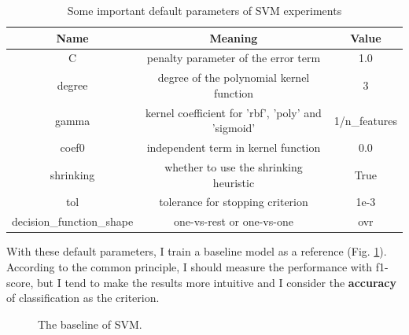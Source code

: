 \documentclass[12pt,a4paper]{article}
\theoremstyle{definition}
\begin{document}
\begin{table}[H]
	\renewcommand\arraystretch{1.35}
	\caption{Some important default parameters of SVM experiments}
	\label{tab:default-para}
	\centering
	
	\begin{tabular}{c|c|c}
		\centering
		Name & Meaning & Value \\
		\hline
		\hline
		
		C & penalty parameter of the error term & 1.0 \\
		degree & degree of the polynomial kernel function & 3 \\
		gamma & kernel coefficient for 'rbf', 'poly' and 'sigmoid' & 1/n\_features \\
		coef0 & independent term in kernel function & 0.0 \\
		shrinking & whether to use the shrinking heuristic & True \\
		tol & tolerance for stopping criterion & 1e-3 \\
		decision\_function\_shape & one-vs-rest or one-vs-one & ovr \\
		
	\end{tabular}
\end{table}

With these default parameters, I train a baseline model as a reference (Fig. \ref{fig:svm-baseline}). According to the common principle, I should measure the performance with f1-score, but I tend to make the results more intuitive and I consider the \textbf{accuracy} of classification as the criterion.

\begin{figure}[H]
	\centering
	\caption{The baseline of SVM.}
	\label{fig:svm-baseline}
\end{figure}
\end{document}

